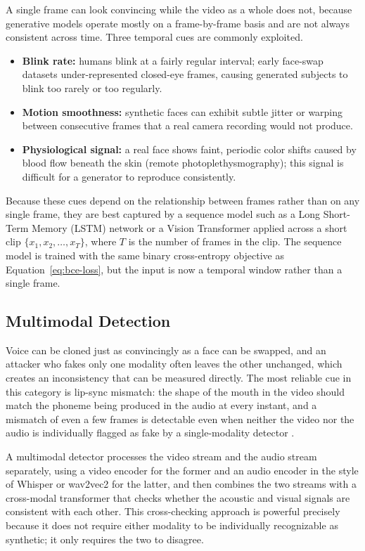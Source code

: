\documentclass[a4paper,12pt]{article}
\begin{document}
A single frame can look convincing while the video as a whole does not, because generative models operate mostly on a frame-by-frame basis and are not always consistent across time. Three temporal cues are commonly exploited.
\begin{itemize}
    \item \textbf{Blink rate:} humans blink at a fairly regular interval; early face-swap datasets under-represented closed-eye frames, causing generated subjects to blink too rarely or too regularly.
    \item \textbf{Motion smoothness:} synthetic faces can exhibit subtle jitter or warping between consecutive frames that a real camera recording would not produce.
    \item \textbf{Physiological signal:} a real face shows faint, periodic color shifts caused by blood flow beneath the skin (remote photoplethysmography); this signal is difficult for a generator to reproduce consistently.
\end{itemize}
Because these cues depend on the relationship between frames rather than on any single frame, they are best captured by a sequence model such as a Long Short-Term Memory (LSTM) network or a Vision Transformer applied across a short clip $\{x_1, x_2, \dots, x_T\}$, where $T$ is the number of frames in the clip. The sequence model is trained with the same binary cross-entropy objective as Equation~\ref{eq:bce-loss}, but the input is now a temporal window rather than a single frame.

\subsection{Multimodal Detection}
\label{subsec:multimodal}

Voice can be cloned just as convincingly as a face can be swapped, and an attacker who fakes only one modality often leaves the other unchanged, which creates an inconsistency that can be measured directly. The most reliable cue in this category is lip-sync mismatch: the shape of the mouth in the video should match the phoneme being produced in the audio at every instant, and a mismatch of even a few frames is detectable even when neither the video nor the audio is individually flagged as fake by a single-modality detector \cite{agarwal2020}.

A multimodal detector processes the video stream and the audio stream separately, using a video encoder for the former and an audio encoder in the style of Whisper or wav2vec2 for the latter, and then combines the two streams with a cross-modal transformer that checks whether the acoustic and visual signals are consistent with each other. This cross-checking approach is powerful precisely because it does not require either modality to be individually recognizable as synthetic; it only requires the two to disagree.
\end{document}
